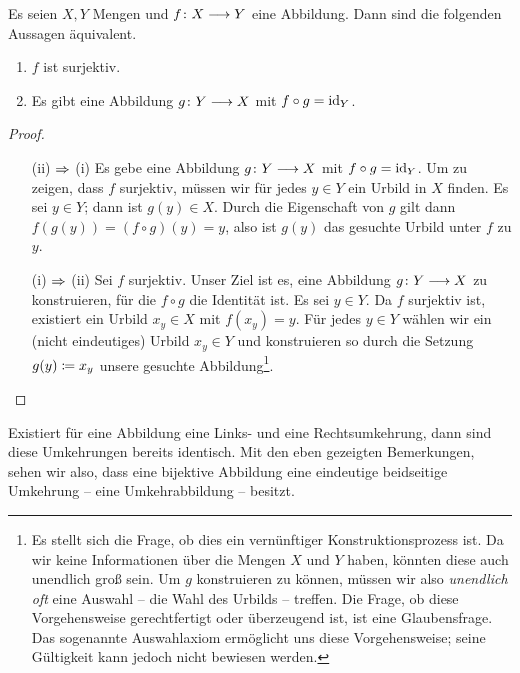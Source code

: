 
\begin{bem}

  Es seien $X,Y$ Mengen und $f\colon X \longrightarrow Y$ eine Abbildung. Dann sind die
  folgenden Aussagen äquivalent.

  \begin{enumerate}
    \item $f$ ist surjektiv.
    \item Es gibt eine Abbildung $g\colon Y \longrightarrow X$ mit $f\circ g = \operatorname{id}_{Y}$.
  \end{enumerate}

  \begin{proof}
    \quad 

    \begin{itemize}
    \item[\tiny{(ii) $\Rightarrow$ (i)}] Es gebe eine Abbildung $g\colon Y \longrightarrow X$
      mit $f\circ g = \operatorname{id}_{Y}$. Um zu zeigen, dass $f$ surjektiv, müssen
      wir für jedes $y\in Y$ ein Urbild in $X$ finden. Es sei $y\in Y$;
      dann ist $g(y)\in X$. Durch die Eigenschaft von $g$ gilt dann
      $f(g(y)) = (f\circ g)(y) = y$, also ist $g(y)$ das gesuchte Urbild
      unter $f$ zu $y$.
    \item[\tiny{(i) $\Rightarrow$ (ii)}] Sei $f$ surjektiv. Unser Ziel ist es, eine
      Abbildung $g\colon Y \longrightarrow X$ zu konstruieren, für die $f\circ g$ die
      Identität ist. Es sei $y\in Y$. Da $f$ surjektiv ist, existiert ein
      Urbild $x_{y}\in X$ mit $f(x_{y}) = y$. Für jedes $y\in Y$ wählen wir
      ein (nicht eindeutiges) Urbild $x_{y}\in Y$ und konstruieren so durch
      die Setzung $g(y) \coloneqq x_{y}$ unsere gesuchte Abbildung\footnote{Es
        stellt sich die Frage, ob dies ein vernünftiger
        Konstruktionsprozess ist. Da wir keine Informationen über die
        Mengen $X$ und $Y$ haben, könnten diese auch unendlich groß
        sein. Um $g$ konstruieren zu können, müssen wir also
        \emph{unendlich oft} eine Auswahl -- die Wahl des Urbilds --
        treffen. Die Frage, ob diese Vorgehensweise gerechtfertigt oder
        überzeugend ist, ist eine Glaubensfrage. Das sogenannte
        Auswahlaxiom ermöglicht uns diese Vorgehensweise; seine Gültigkeit
        kann jedoch nicht bewiesen werden.}.
    \end{itemize}
  \end{proof}

\end{bem}


Existiert für eine Abbildung eine Links- und eine Rechtsumkehrung, dann
sind diese Umkehrungen bereits identisch. Mit den eben gezeigten
Bemerkungen, sehen wir also, dass eine bijektive Abbildung eine eindeutige
beidseitige Umkehrung -- eine Umkehrabbildung -- besitzt.

